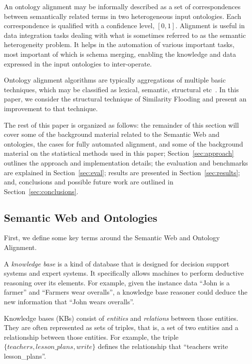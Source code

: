 \documentclass[letterpaper,twocolumn,12pt]{article}
\begin{document}
An ontology alignment may be informally described as a set of correspondences between semantically related terms in two heterogeneous input ontologies. 
Each correspondence is qualified with a confidence level, $[0,1]$.
Alignment is useful in data integration tasks dealing with what is sometimes referred to as the semantic heterogeneity problem. 
It helps in the automation of various important tasks, most important of which is schema merging, enabling the knowledge and data expressed in the input ontologies to inter-operate.

Ontology alignment algorithms are typically aggregations of multiple basic techniques, which may be classified as lexical, semantic, structural etc~\cite{euzenat:2007:ontology}.
In this paper, we consider the structural technique of Similarity Flooding and present an improvement to that technique.

\noindent The rest of this paper is organized as follows: 
the remainder of this section will cover some of the background material related to the Semantic Web and ontologies, the cases for fully automated alignment, and some of the background material on the statistical methods used in this paper; 
Section~\ref{sec:approach} outlines the approach and implementation details; 
the evaluation and benchmarks are explained in Section~\ref{sec:eval}; 
results are presented in Section~\ref{sec:results}; and, 
conclusions and possible future work are outlined in Section~\ref{sec:conclusions}.

\subsection{Semantic Web and Ontologies}
\label{subsec:semanticweb}
First, we define some key terms around the Semantic Web and Ontology Alignment.

A \textit{knowledge base} is a kind of database that is designed for decision support systems and expert systems. 
It specifically allows machines to perform deductive reasoning over its elements.
For example, given the instance data ``John is a farmer'' and ``Farmers wear overalls'', a knowledge base reasoner could deduce the new information that ``John wears overalls''.

Knowledge bases (KBs) consist of \textit{entities} and \textit{relations} between those entities. 
They are often represented as sets of triples, that is, a set of two entities and a relationship between those entities. 
For example, the triple ${\{teachers, lesson\_plans, write\}}$ defines the relationship that ``teachers write lesson\_plans''.
\end{document}
